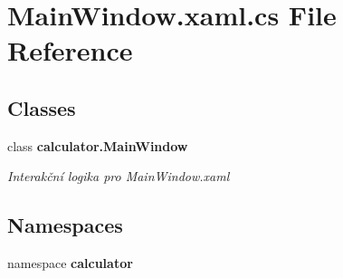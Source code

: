 \section{Main\+Window.\+xaml.\+cs File Reference}
\label{_main_window_8xaml_8cs}
\subsection*{Classes}
\begin{DoxyCompactItemize}
\item 
class \textbf{ calculator.\+Main\+Window}
\begin{DoxyCompactList}\small\item\em Interakční logika pro Main\+Window.\+xaml \end{DoxyCompactList}\end{DoxyCompactItemize}
\subsection*{Namespaces}
\begin{DoxyCompactItemize}
\item 
namespace \textbf{ calculator}
\end{DoxyCompactItemize}
